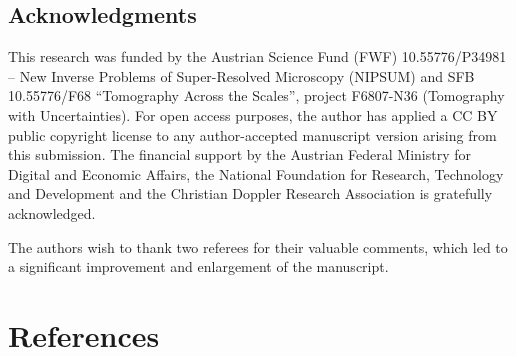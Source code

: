 \documentclass[10pt]{article}
\numberwithin{equation}{section}
\theoremstyle{nonumberplain}
\let\ii\i
\renewcommand{\i}{\mathrm i}
\begin{document}
\subsection*{Acknowledgments}
This research was funded by the Austrian Science Fund
(FWF) 10.55776/P34981 -- New Inverse Problems of Super-Resolved Microscopy (NIPSUM) and 
SFB 10.55776/F68 ``Tomography Across the Scales'', project F6807-N36
(Tomography with Uncertainties). For open access purposes, the author has
applied a CC BY public copyright license to any author-accepted manuscript
version arising from this submission.
The financial support by the Austrian Federal Ministry for Digital and Economic
Affairs, the National Foundation for Research, Technology and Development and the Christian Doppler
Research Association is gratefully acknowledged. 

The authors wish to thank two referees for their valuable comments, which led to a significant 
improvement and enlargement of the manuscript.
\section*{References}
\renewcommand{\i}{\ii}
\printbibliography[heading=none]
\end{document}
